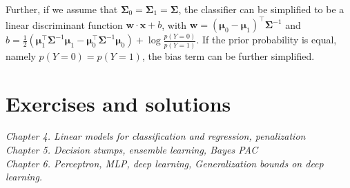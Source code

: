 \documentclass{article}
\begin{document}
	Further, if we assume that $\bm{\Sigma}_0=\bm{\Sigma}_1=\bm{\Sigma}$, the classifier can be simplified to be a linear discriminant function $\bm{w}\cdot\bm{x}+b$, with $\bm{w}=(\bm{\mu}_0 - \bm{\mu}_1)^\top\bm{\Sigma}^{-1}$ and $b=\frac{1}{2} (\bm{\mu}_1^\top\bm{\Sigma}^{-1}\bm{\mu}_1 - \bm{\mu}_0^\top\bm{\Sigma}^{-1}\bm{\mu}_0 ) + \log \frac{p(Y=0)}{p(Y=1)}$. If the prior probability is equal, namely $p(Y=0)=p(Y=1)$, the bias term can be further simplified.
	
	
	
	
\section{Exercises and solutions}

\textit{
	Chapter 4. Linear models for classification and regression, penalization \\
	  Chapter 5. Decision stumps, ensemble learning, Bayes PAC \\
      Chapter 6. Perceptron, MLP, deep learning, Generalization bounds on deep learning.}
\end{document}
